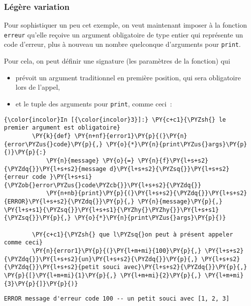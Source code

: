     \hypertarget{luxe9guxe8re-variation}{%
\subsubsection{Légère variation}\label{luxe9guxe8re-variation}}

    Pour sophistiquer un peu cet exemple, on veut maintenant imposer à la
fonction \texttt{erreur} qu'elle reçoive un argument obligatoire de type
entier qui représente un code d'erreur, plus à nouveau un nombre
quelconque d'arguments pour \texttt{print}.

Pour cela, on peut définir une signature (les paramètres de la fonction)
qui

\begin{itemize}
\tightlist
\item
  prévoit un argument traditionnel en première position, qui sera
  obligatoire lors de l'appel,
\item
  et le tuple des arguments pour \texttt{print}, comme ceci~:
\end{itemize}

    \begin{Verbatim}[commandchars=\\\{\},frame=single,framerule=0.3mm,rulecolor=\color{cellframecolor}]
{\color{incolor}In [{\color{incolor}3}]:} \PY{c+c1}{\PYZsh{} le premier argument est obligatoire}
        \PY{k}{def} \PY{n+nf}{error1}\PY{p}{(}\PY{n}{error\PYZus{}code}\PY{p}{,} \PY{o}{*}\PY{n}{print\PYZus{}args}\PY{p}{)}\PY{p}{:}
            \PY{n}{message} \PY{o}{=} \PY{n}{f}\PY{l+s+s2}{\PYZdq{}}\PY{l+s+s2}{message d}\PY{l+s+s2}{\PYZsq{}}\PY{l+s+s2}{erreur code }\PY{l+s+si}{\PYZob{}error\PYZus{}code\PYZcb{}}\PY{l+s+s2}{\PYZdq{}}
            \PY{n+nb}{print}\PY{p}{(}\PY{l+s+s2}{\PYZdq{}}\PY{l+s+s2}{ERROR}\PY{l+s+s2}{\PYZdq{}}\PY{p}{,} \PY{n}{message}\PY{p}{,} \PY{l+s+s1}{\PYZsq{}}\PY{l+s+s1}{\PYZhy{}\PYZhy{}}\PY{l+s+s1}{\PYZsq{}}\PY{p}{,} \PY{o}{*}\PY{n}{print\PYZus{}args}\PY{p}{)}
            
        \PY{c+c1}{\PYZsh{} que l\PYZsq{}on peut à présent appeler comme ceci}
        \PY{n}{error1}\PY{p}{(}\PY{l+m+mi}{100}\PY{p}{,} \PY{l+s+s2}{\PYZdq{}}\PY{l+s+s2}{un}\PY{l+s+s2}{\PYZdq{}}\PY{p}{,} \PY{l+s+s2}{\PYZdq{}}\PY{l+s+s2}{petit souci avec}\PY{l+s+s2}{\PYZdq{}}\PY{p}{,} \PY{p}{[}\PY{l+m+mi}{1}\PY{p}{,} \PY{l+m+mi}{2}\PY{p}{,} \PY{l+m+mi}{3}\PY{p}{]}\PY{p}{)}
\end{Verbatim}


    \begin{Verbatim}[commandchars=\\\{\},frame=single,framerule=0.3mm,rulecolor=\color{cellframecolor}]
ERROR message d'erreur code 100 -- un petit souci avec [1, 2, 3]
\end{Verbatim}

